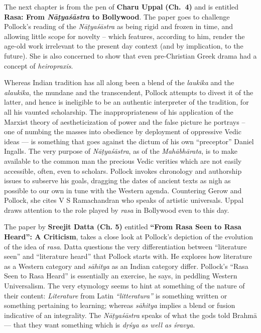 The next chapter is from the pen of {\bf Charu Uppal} {\bf(Ch.~4)} and is entitled {\bf Rasa: From \textsl{Nāṭyaśāstra} to Bollywood}. The paper goes to challenge Pollock’s reading of the \textsl{Nāṭyaśāstra} as being rigid and frozen in time, and allowing little scope for novelty -- which features, according to him, render the age-old work irrelevant to the present day context (and by implication, to the future). She is also concerned to show that even pre-Christian Greek drama had a concept of \textsl{heiropraxis}.

Whereas Indian tradition has all along been a blend of the \textsl{laukika} and the \textsl{alaukika}, the mundane and the transcendent, Pollock attempts to divest it of the latter, and hence is ineligible to be an authentic interpreter of the tradition, for all his vaunted scholarship. The inappropriateness of his application of the Marxist theory of aestheticization of power and the false picture he portrays -- one of numbing the masses into obedience by deployment of oppressive Vedic ideas --- is something that goes against the dictum of his own “preceptor” Daniel Ingalls. The very purpose of \textsl{Nāṭyaśāstra}, as of the \textsl{Mahābhārata}, is to make available to the common man the precious Vedic verities which are not easily accessible, often, even to scholars. Pollock invokes chronology and authorship issues to subserve his goals, dragging the dates of ancient texts as nigh as possible to our own in tune with the Western agenda. Countering Gerow and Pollock, she cites V S Ramachandran who speaks of artistic universals. Uppal draws attention to the role played by \textsl{rasa} in Bollywood even to this day.

The paper by {\bf Sreejit Datta (Ch. 5)} entitled {\bf “From Rasa Seen to Rasa Heard”: A Criticism}, takes a close look at Pollock’s depiction of the evolution of the idea of \textsl{rasa}. Datta questions the very differentiation between “literature seen” and “literature heard” that Pollock starts with. He explores how literature as a Western category and \textsl{sāhitya} as an Indian category differ. Pollock’s “Rasa Seen to Rasa Heard” is essentially an exercise, he says, in peddling Western Universalism. The very etymology seems to hint at something of the nature of their content: \textsl{Literature} from Latin \textsl{“litteratura”} is something written or something pertaining to learning; whereas \textsl{sāhitya} implies a blend or fusion indicative of an integrality. The \textsl{Nāṭyaśāstra} speaks of what the gods told Brahmā --- that they want something which is \textsl{dṛśya} \textsl{as well as śravya}.

